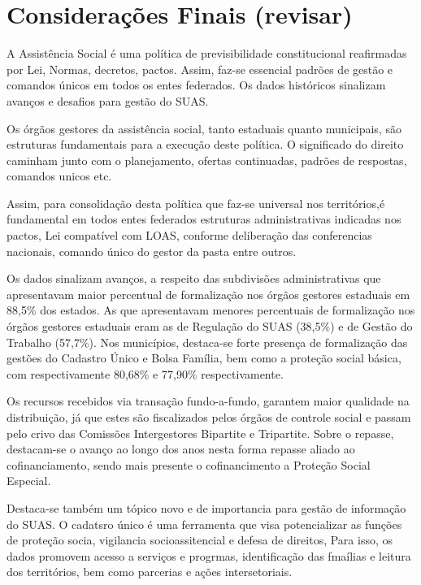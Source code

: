 \documentclass[
  brazilian]{report}
\begin{document}
\hypertarget{considerauxe7uxf5es-finais-revisar}{%
\section{Considerações Finais
(revisar)}\label{considerauxe7uxf5es-finais-revisar}}

A Assistência Social é uma política de previsibilidade constitucional
reafirmadas por Lei, Normas, decretos, pactos. Assim, faz-se essencial
padrões de gestão e comandos únicos em todos os entes federados. Os
dados históricos sinalizam avanços e desafios para gestão do SUAS.

Os órgãos gestores da assistência social, tanto estaduais quanto
municipais, são estruturas fundamentais para a execução deste política.
O significado do direito caminham junto com o planejamento, ofertas
continuadas, padrões de respostas, comandos unicos etc.

Assim, para consolidação desta política que faz-se universal nos
territórios,é fundamental em todos entes federados estruturas
administrativas indicadas nos pactos, Lei compatível com LOAS, conforme
deliberação das conferencias nacionais, comando único do gestor da pasta
entre outros.

Os dados sinalizam avanços, a respeito das subdivisões administrativas
que apresentavam maior percentual de formalização nos órgãos gestores
estaduais em 88,5\% dos estados. As que apresentavam menores percentuais
de formalização nos órgãos gestores estaduais eram as de Regulação do
SUAS (38,5\%) e de Gestão do Trabalho (57,7\%). Nos municípios,
destaca-se forte presença de formalização das gestões do Cadastro Único
e Bolsa Família, bem como a proteção social básica, com respectivamente
80,68\% e 77,90\% respectivamente.

Os recursos recebidos via transação fundo-a-fundo, garantem maior
qualidade na distribuição, já que estes são fiscalizados pelos órgãos de
controle social e passam pelo crivo das Comissões Intergestores
Bipartite e Tripartite. Sobre o repasse, destacam-se o avanço ao longo
dos anos nesta forma repasse aliado ao cofinanciamento, sendo mais
presente o cofinancimento a Proteção Social Especial.

Destaca-se também um tópico novo e de importancia para gestão de
informação do SUAS. O cadatsro único é uma ferramenta que visa
potencializar as funções de proteção socia, vigilancia socioassitencial
e defesa de direitos, Para isso, os dados promovem acesso a serviços e
progrmas, identificação das fmaílias e leitura dos territórios, bem como
parcerias e ações intersetoriais.
\end{document}
